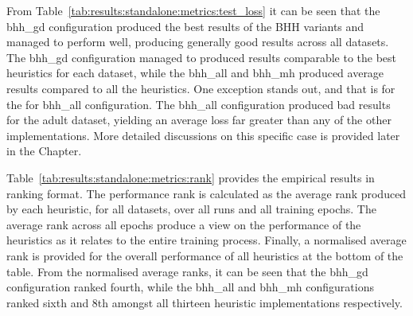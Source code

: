 From Table~\ref{tab:results:standalone:metrics:test_loss} it can be seen that the bhh\_gd configuration produced the best results of the \acs{BHH} variants and managed to perform well, producing generally good results across all datasets. The bhh\_gd configuration managed to produced results comparable to the best heuristics for each dataset, while the bhh\_all and bhh\_mh produced average results compared to all the heuristics. One exception stands out, and that is for the for bhh\_all configuration. The bhh\_all configuration produced bad results for the adult dataset, yielding an average loss far greater than any of the other implementations. More detailed discussions on this specific case is provided later in the Chapter.

Table~\ref{tab:results:standalone:metrics:rank} provides the empirical results in ranking format. The performance rank is calculated as the average rank produced by each heuristic, for all datasets, over all runs and all training epochs. The average rank across all epochs produce a view on the performance of the heuristics as it relates to the entire training process. Finally, a normalised average rank is provided for the overall performance of all heuristics at the bottom of the table. From the normalised average ranks, it can be seen that the bhh\_gd configuration ranked fourth, while the bhh\_all and bhh\_mh configurations ranked sixth and 8th amongst all thirteen heuristic implementations respectively.

